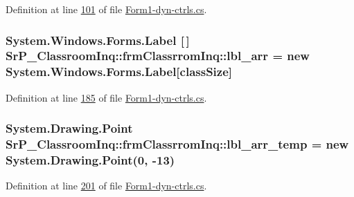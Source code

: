 \-Definition at line \hyperlink{_form1-dyn-ctrls_8cs_source_l00101}{101} of file \hyperlink{_form1-dyn-ctrls_8cs_source}{\-Form1-\/dyn-\/ctrls.\-cs}.

\hypertarget{class_sr_p___classroom_inq_1_1frm_classrrom_inq_a7f0a5f5fff7a87e841b2793f89dcd997}{
\subsubsection[{lbl\-\_\-arr}]{\setlength{\rightskip}{0pt plus 5cm}\-System.\-Windows.\-Forms.\-Label \mbox{[}$\,$\mbox{]} {\bf \-Sr\-P\-\_\-\-Classroom\-Inq\-::frm\-Classrrom\-Inq\-::lbl\-\_\-arr} = new \-System.\-Windows.\-Forms.\-Label\mbox{[}{\bf class\-Size}\mbox{]}}}
\label{class_sr_p___classroom_inq_1_1frm_classrrom_inq_a7f0a5f5fff7a87e841b2793f89dcd997}


\-Definition at line \hyperlink{_form1-dyn-ctrls_8cs_source_l00185}{185} of file \hyperlink{_form1-dyn-ctrls_8cs_source}{\-Form1-\/dyn-\/ctrls.\-cs}.

\hypertarget{class_sr_p___classroom_inq_1_1frm_classrrom_inq_ae3405b23105270490b9685ac52e1b574}{
\subsubsection[{lbl\-\_\-arr\-\_\-temp}]{\setlength{\rightskip}{0pt plus 5cm}\-System.\-Drawing.\-Point {\bf \-Sr\-P\-\_\-\-Classroom\-Inq\-::frm\-Classrrom\-Inq\-::lbl\-\_\-arr\-\_\-temp} = new \-System.\-Drawing.\-Point(0, -\/13)}}
\label{class_sr_p___classroom_inq_1_1frm_classrrom_inq_ae3405b23105270490b9685ac52e1b574}


\-Definition at line \hyperlink{_form1-dyn-ctrls_8cs_source_l00201}{201} of file \hyperlink{_form1-dyn-ctrls_8cs_source}{\-Form1-\/dyn-\/ctrls.\-cs}.

